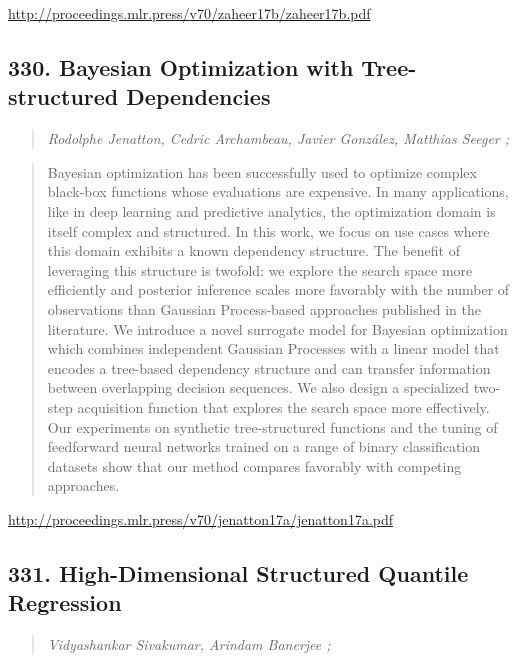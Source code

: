 \documentclass{article}
\begin{document}
\href{http://proceedings.mlr.press/v70/zaheer17b/zaheer17b.pdf}{http://proceedings.mlr.press/v70/zaheer17b/zaheer17b.pdf}

\subsection{330. Bayesian Optimization with Tree-structured Dependencies}

\begin{quote}
\footnotesize{\textit{Rodolphe Jenatton, Cedric Archambeau, Javier González, Matthias Seeger ;}}
\end{quote}

\begin{quote}
    Bayesian optimization has been successfully used to optimize complex black-box functions whose evaluations are expensive. In many applications, like in deep learning and predictive analytics, the optimization domain is itself complex and structured. In this work, we focus on use cases where this domain exhibits a known dependency structure. The benefit of leveraging this structure is twofold: we explore the search space more efficiently and posterior inference scales more favorably with the number of observations than Gaussian Process-based approaches published in the literature. We introduce a novel surrogate model for Bayesian optimization which combines independent Gaussian Processes with a linear model that encodes a tree-based dependency structure and can transfer information between overlapping decision sequences. We also design a specialized two-step acquisition function that explores the search space more effectively. Our experiments on synthetic tree-structured functions and the tuning of feedforward neural networks trained on a range of binary classification datasets show that our method compares favorably with competing approaches.  \end{quote}

\href{http://proceedings.mlr.press/v70/jenatton17a/jenatton17a.pdf}{http://proceedings.mlr.press/v70/jenatton17a/jenatton17a.pdf}

\subsection{331. High-Dimensional Structured Quantile Regression}

\begin{quote}
\footnotesize{\textit{Vidyashankar Sivakumar, Arindam Banerjee ;}}
\end{quote}
\end{document}
